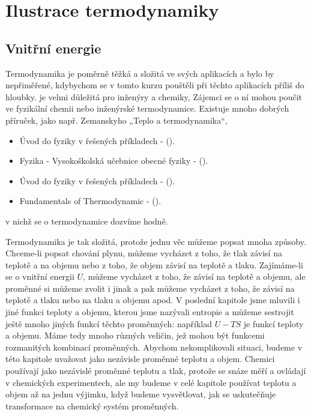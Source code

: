 \setchaptertoc
\chapter{Ilustrace termodynamiky}\label{fyz:IchapXLV}
  \section{Vnitřní energie}\label{fyz:IchapXLVsecI}
    Termodynamika je poměrně těžká a složitá ve svých aplikacích a bylo by nepřiměřené, kdybychom se
    v tomto kurzu pouštěli při těchto aplikacích příliš do hloubky. je velmi důležitá pro inženýry a
    chemiky, Zájemci se o ní mohou poučit ve fyzikální chemii nebo inženýrské termodynamice.
    Existuje mnoho dobrých příruček, jako např. Zemanskyho „Teplo a termodynamika“, 
    \begin{itemize}][noitemsep]
      \item Úvod do fyziky v řešených příkladech - (\cite{Havrankova1995}).
      \item Fyzika - Vysokoškolská učebnice obecné fyziky - (\cite{Halliday2001}).
      \item Úvod do fyziky v řešených příkladech - (\cite{Havrankova1995}).
      \item Fundamentals of Thermodynamic - (\cite{Borgnakke2012}).
    \end{itemize}
    v nichž se o termodynamice dozvíme hodně. 

    Termodynamika je tak složitá, protože jednu věc můžeme popsat mnoha způsoby. Chceme-li popsat
    chování plynu, můžeme vycházet z toho, že tlak závisí na teplotě a na objemu nebo z toho, že
    objem závisí na teplotě a tlaku. Zajímáme-li se o vnitřní energii \(U\), můžeme vycházet z toho,
    že závisí na teplotě a objemu, ale proměnné si můžeme zvolit i jinak a pak můžeme vycházet z
    toho, že závisí na teplotě a tlaku nebo na tlaku a objemu apod. V poslední kapitole jsme mluvili
    i jiné funkci teploty a objemu, kterou jsme nazývali entropie a můžeme sestrojit ještě mnoho
    jiných funkcí těchto proměnných: například \(U - TS\) je funkcí teploty a objemu. Máme tedy
    mnoho různých veličin, jež mohou být funkcemi rozmanitých kombinací proměnných. Abychom
    nekomplikovali situaci, budeme v této kapitole uvažovat jako nezávisle proměnné teplotu a objem.
    Chemici používají jako nezávislé proměnné teplotu a tlak, protože se snáze měří a ovládají v
    chemických experimentech, ale my budeme v celé kapitole používat teplotu a objem až na jednu
    výjimku, když budeme vysvětlovat, jak se uskutečňuje transformace na chemický systém proměnných.
    
